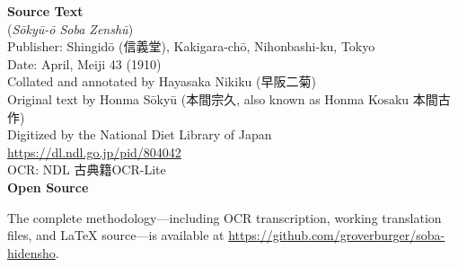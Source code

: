 \documentclass[10pt, openany]{book}
\newcommand{\jp}[1]{{\japanesefont #1}}
\begin{document}
\begin{small}
\noindent\textbf{Source Text}\\[0.3em]
\noindent\jp{宗久翁相場全集} (\textit{S\=oky\=u-\=o Soba Zensh\=u})\\
Publisher: Shingid\=o (\jp{信義堂}), Kakigara-ch\=o, Nihonbashi-ku, Tokyo\\
Date: April, Meiji 43 (1910)\\
Collated and annotated by Hayasaka Nikiku (\jp{早阪二菊})\\
Original text by Honma S\=oky\=u (\jp{本間宗久}, also known as Honma Kosaku \jp{本間古作})\\[0.5em]
Digitized by the National Diet Library of Japan\\
\url{https://dl.ndl.go.jp/pid/804042}\\
OCR: NDL \jp{古典籍OCR-Lite}\\[1em]

\noindent\textbf{Open Source}\\[0.3em]
\begin{sloppypar}\noindent The complete methodology---including
OCR transcription, working translation files, and \LaTeX{} source---is
available at
\url{https://github.com/groverburger/soba-hidensho}.
\end{sloppypar}
\end{small}
\newpage

\thispagestyle{empty}
~\vfill
\end{document}
